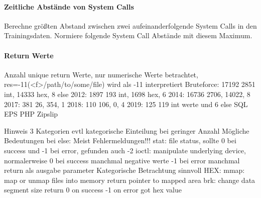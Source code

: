             \paragraph{Zeitliche Abstände von System Calls}
                Berechne größten Abstand zwischen zwei aufeinanderfolgende System Calls in den Trainingsdaten.
                Normiere folgende System Call Abstände mit diesem Maximum.

            \paragraph{Return Werte}
                Anzahl unique return Werte, nur numerische Werte betrachtet, 
                res=-11(<f>/path/to/some/file) wird als -11 interpretiert
                Bruteforce: 17192 2851 int, 14333 hex, 8 else
                2012:       1897 193 int, 1698 hex, 6
                2014:       16736 2706, 14022, 8
                2017:       381 26, 354, 1 
                2018:       110 106, 0, 4 
                2019:       125 119 int werte und 6 else
                SQL
                EPS
                PHP
                Zipslip

                Hinweis 3 Kategorien evtl kategorische Einteilung bei geringer Anzahl
                Mögliche Bedeutungen bei else:
                    Meist Fehlermeldungen!!!
                    stat:
                        file status, 
                        sollte 0 bei success und -1 bei error, gefunden auch -2 
                    ioctl:
                        manipulate underlying device, 
                        normalerweise 0 bei success manchmal negative werte
                        -1 bei error
                        manchmal return als ausgabe parameter
                    Kategorische Betrachtung sinnvoll
                HEX:\@
                    mmap:
                        map or unmap files into memory
                        return pointer to mapped area
                    brk:
                        change data segment size
                        return 0 on success -1 on error
                        got hex value

